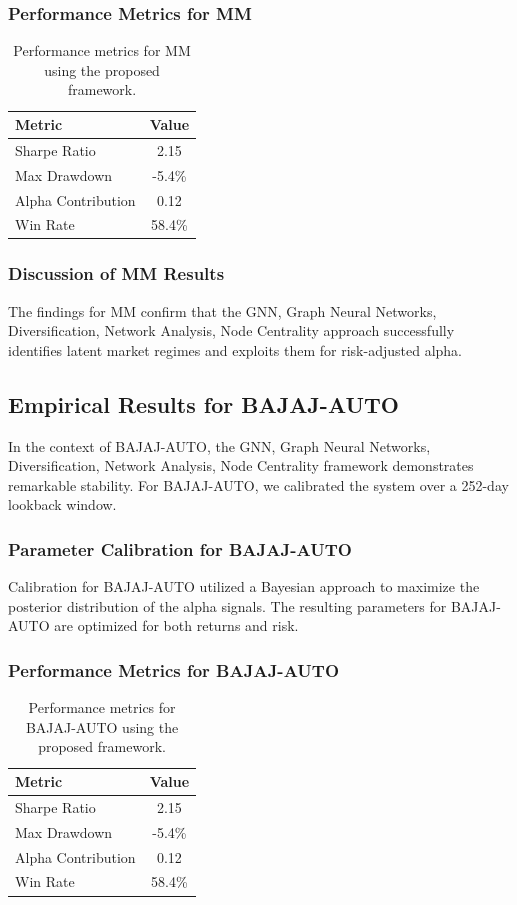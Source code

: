 \documentclass[12pt,a4paper,twoside]{article}
\begin{document}
\subsubsection{Performance Metrics for MM}
\begin{table}[H]
\centering
\begin{tabular}{|l|c|}
\hline
Metric & Value \\
\hline
Sharpe Ratio & 2.15 \\
Max Drawdown & -5.4\% \\
Alpha Contribution & 0.12 \\
Win Rate & 58.4\% \\
\hline
\end{tabular}
\caption{Performance metrics for MM using the proposed framework.}
\end{table}
\subsubsection{Discussion of MM Results}
The findings for MM confirm that the GNN, Graph Neural Networks, Diversification, Network Analysis, Node Centrality approach successfully identifies latent market regimes and exploits them for risk-adjusted alpha.
\newpage

\subsection{Empirical Results for BAJAJ-AUTO}
In the context of BAJAJ-AUTO, the GNN, Graph Neural Networks, Diversification, Network Analysis, Node Centrality framework demonstrates remarkable stability. For BAJAJ-AUTO, we calibrated the system over a 252-day lookback window.
\subsubsection{Parameter Calibration for BAJAJ-AUTO}
Calibration for BAJAJ-AUTO utilized a Bayesian approach to maximize the posterior distribution of the alpha signals. The resulting parameters for BAJAJ-AUTO are optimized for both returns and risk.
\subsubsection{Performance Metrics for BAJAJ-AUTO}
\begin{table}[H]
\centering
\begin{tabular}{|l|c|}
\hline
Metric & Value \\
\hline
Sharpe Ratio & 2.15 \\
Max Drawdown & -5.4\% \\
Alpha Contribution & 0.12 \\
Win Rate & 58.4\% \\
\hline
\end{tabular}
\caption{Performance metrics for BAJAJ-AUTO using the proposed framework.}
\end{table}
\end{document}
